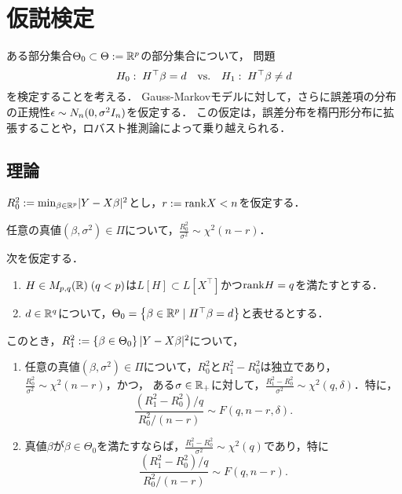 \documentclass[uplatex,dvipdfmx]{jsreport}
\begin{document}
\section{仮説検定}

\begin{tcolorbox}[colframe=ForestGreen, colback=ForestGreen!10!white,breakable,colbacktitle=ForestGreen!40!white,coltitle=black,fonttitle=\bfseries\sffamily,
title=]
    ある部分集合$\Theta_0\subset\Theta:=\mathbb{R}^p$の部分集合について，
    問題
    \[H_0:\; H^\top\beta=d\quad\mathrm{vs.}\quad H_1:\; H^\top\beta\ne d\]
    を検定することを考える．
    Gauss-Markovモデルに対して，さらに誤差項の分布の正規性$\epsilon\sim N_n(0,\sigma^2I_n)$を仮定する．
    この仮定は，誤差分布を楕円形分布に拡張することや，ロバスト推測論によって乗り越えられる．
\end{tcolorbox}

\subsection{理論}

\begin{notation}
    $R_0^2:=\min_{\beta\in\mathbb{R}^p}\lvert Y-X\beta\rvert^2$とし，$r:=\mathrm{rank} X<n$を仮定する．
\end{notation}

\begin{theorem}
    任意の真値$(\beta,\sigma^2)\in\Pi$について，$\frac{R^2_0}{\sigma^2}\sim\chi^2(n-r)$．
\end{theorem}

\begin{theorem}
    次を仮定する．
    \begin{enumerate}[({A}1)]
        \item $H\in M_{p,q}(\mathbb{R})\;(q<p)$は$L[H]\subset L[X^\top]$かつ$\mathrm{rank} H=q$を満たすとする．
        \item $d\in\mathbb{R}^q$について，$\Theta_0=\left\{\beta\in\mathbb{R}^p\mid H^\top\beta=d\right\}$と表せるとする．
    \end{enumerate}
    このとき，$R^2_1:=\left\{\beta\in\Theta_0\right\}\lvert Y-X\beta\rvert^2$について，
    \begin{enumerate}
        \item 任意の真値$(\beta,\sigma^2)\in\Pi$について，$R^2_0$と$R^2_1-R^2_0$は独立であり，$\frac{R^2_0}{\sigma^2}\sim\chi^2(n-r)$，かつ，
        ある$\sigma\in\mathbb{R}_+$に対して，$\frac{R^2_1-R^2_0}{\sigma^2}\sim\chi^2(q,\delta)$．特に，
        \[\frac{(R^2_1-R^2_0)/q}{R^2_0/(n-r)}\sim F(q,n-r,\delta).\]
        \item 真値$\beta$が$\beta\in\Theta_0$を満たすならば，$\frac{R^2_1-R^2_0}{\sigma^2}\sim\chi^2(q)$であり，特に
        \[\frac{(R^2_1-R^2_0)/q}{R^2_0/(n-r)}\sim F(q,n-r).\]
    \end{enumerate}
\end{theorem}
\end{document}
